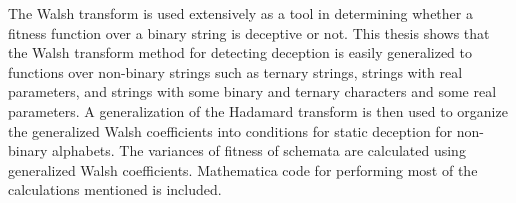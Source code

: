 \typeout{}

\begin{abstractpage}
The Walsh transform is used extensively as a tool in determining whether a
fitness function over a binary string is deceptive or not.  This thesis shows
that the Walsh transform method for detecting deception is easily generalized to
functions over non-binary strings such as ternary strings, strings with
real parameters, and strings with some binary and ternary characters and
some real parameters.
  A generalization of the Hadamard transform
is then used to organize the generalized Walsh coefficients into
conditions for static deception for non-binary alphabets.
The variances of fitness of schemata are calculated using generalized
Walsh coefficients.  Mathematica code for performing most of the 
calculations mentioned is included.
\end{abstractpage}

